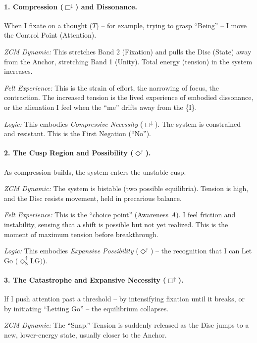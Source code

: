 \documentclass[12pt]{book}
\newcommand{\SDiaUp}{\Diamond_{\mathsf{S}}^{\uparrow}}
\begin{document}
\paragraph{1. Compression ($\Box^{\downarrow}$) and Dissonance.}

When I fixate on a thought ($T$) -- for example, trying to grasp ``Being'' -- I move the Control Point (Attention).

\textit{ZCM Dynamic:} This stretches Band 2 (Fixation) and pulls the Disc (State) away from the Anchor, stretching Band 1 (Unity). Total energy (tension) in the system increases.

\textit{Felt Experience:} This is the strain of effort, the narrowing of focus, the contraction. The increased tension is the lived experience of embodied dissonance, or the alienation I feel when the ``me'' drifts away from the \{I\}.

\textit{Logic:} This embodies \textit{Compressive Necessity} ($\Box^{\downarrow}$). The system is constrained and resistant. This is the First Negation (``No'').

\paragraph{2. The Cusp Region and Possibility ($\Diamond^{\uparrow}$).}

As compression builds, the system enters the unstable cusp.

\textit{ZCM Dynamic:} The system is bistable (two possible equilibria). Tension is high, and the Disc resists movement, held in precarious balance.

\textit{Felt Experience:} This is the ``choice point'' (Awareness $A$). I feel friction and instability, sensing that a shift is possible but not yet realized. This is the moment of maximum tension before breakthrough.

\textit{Logic:} This embodies \textit{Expansive Possibility} ($\Diamond^{\uparrow}$) -- the recognition that I can Let Go ($\SDiaUp\mathrm{LG})$).

\paragraph{3. The Catastrophe and Expansive Necessity ($\Box^{\uparrow}$).}

If I push attention past a threshold -- by intensifying fixation until it breaks, or by initiating ``Letting Go'' -- the equilibrium collapses.

\textit{ZCM Dynamic:} The ``Snap.'' Tension is suddenly released as the Disc jumps to a new, lower-energy state, usually closer to the Anchor.
\end{document}

